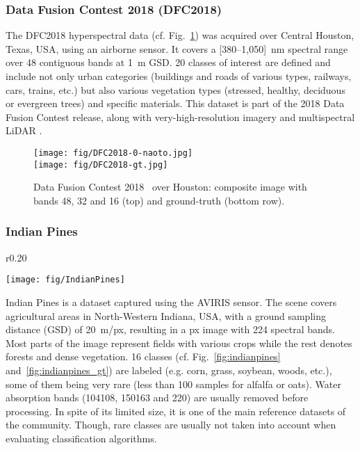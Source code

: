 \documentclass[journal]{IEEEtran}
\begin{document}
\subsubsection{Data Fusion Contest 2018 (DFC2018)}

The DFC2018 hyperspectral data (cf. Fig.~\ref{fig:dfc2018}) was acquired over Central Houston, Texas, USA, using an airborne sensor. It covers a [380--1,050]~nm spectral range over 48 contiguous bands at 1~m GSD. 20 classes of interest are defined and include not only urban categories (buildings and roads of various types, railways, cars, trains, etc.) but also various vegetation types (stressed, healthy, deciduous or evergreen trees) and specific materials. This dataset is part of the 2018 Data Fusion Contest release, along with very-high-resolution imagery and multispectral LiDAR \cite{dfc2018,dfc2018-grsm}.


\begin{figure}[!tbp]
\begin{center}
\texttt{[image: fig/DFC2018-0-naoto.jpg]} \\
\vspace{0.5em}
\texttt{[image: fig/DFC2018-gt.jpg]}
\caption{Data Fusion Contest 2018~\cite{dfc2018} over Houston: composite image with bands 48, 32 and 16 (top) and ground-truth (bottom row).}
\label{fig:dfc2018}
\end{center}
\end{figure}

\subsubsection{Indian Pines}

\begin{wrapfigure}{r}{0.20\textwidth}
\begin{center}
    \texttt{[image: fig/IndianPines]}
  \end{center}
\caption{Indian Pines (natural composite image).}
  \label{fig:indianpines}
\end{wrapfigure}

Indian Pines is a dataset captured using the AVIRIS sensor. The scene covers agricultural areas in North-Western Indiana, USA, with a ground sampling distance (GSD) of 20~m/px, resulting in a px image with 224 spectral bands. Most parts of the image represent fields with various crops while the rest denotes forests and dense vegetation. 16 classes (cf. Fig.~\ref{fig:indianpines} and~\ref{fig:indianpines_gt}) are labeled (e.g. corn, grass, soybean, woods, etc.), some of them being very rare (less than 100 samples for alfalfa or oats). Water absorption bands (104108, 150163 and 220) are usually removed before processing. In spite of its limited size, it is one of the main reference datasets of the community. Though, rare classes are usually not taken into account when evaluating classification algorithms.
\end{document}
